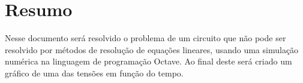 \section{Resumo}
    Nesse documento será resolvido o problema de um circuito
    que não pode ser resolvido por métodos de resolução de 
    equações lineares, usando uma simulação numérica na linguagem
    de programação Octave.
    Ao final deste será criado um gráfico de uma das tensões em
    função do tempo.